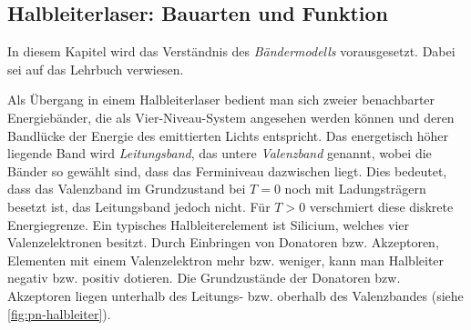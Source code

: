 \subsection{Halbleiterlaser: Bauarten und
Funktion}\label{subsec:halbleiterlaser}
In diesem Kapitel wird das Verständnis des \textit{Bändermodells} vorausgesetzt.
Dabei sei auf das Lehrbuch \cite{demtroeder:ex3} verwiesen.\par
Als Übergang in
einem Halbleiterlaser bedient man sich zweier benachbarter Energiebänder, die
als Vier-Niveau-System angesehen werden
können und deren Bandlücke der Energie des emittierten Lichts entspricht.
Das energetisch höher liegende Band wird \textit{Leitungsband}, das untere
\textit{Valenzband} genannt, wobei die Bänder so gewählt sind, dass das
Ferminiveau dazwischen liegt. Dies bedeutet, dass das Valenzband im Grundzustand
bei $T=0$ noch mit Ladungsträgern besetzt ist, das
Leitungsband jedoch nicht. Für $T>0$ verschmiert diese diskrete
Energiegrenze. Ein typisches Halbleiterelement ist Silicium, welches vier
Valenzelektronen besitzt. Durch Einbringen von Donatoren bzw.
Akzeptoren, Elementen mit einem Valenzelektron mehr bzw. weniger, kann man
Halbleiter negativ bzw. positiv dotieren. Die Grundzustände der Donatoren bzw. Akzeptoren liegen unterhalb des
Leitungs- bzw. oberhalb des Valenzbandes (siehe
\ref{fig:pn-halbleiter}).
